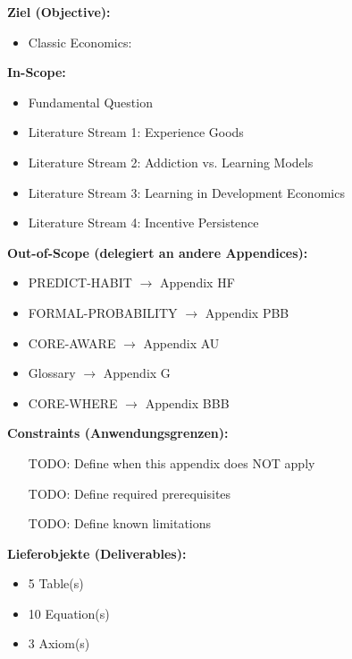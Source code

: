 \documentclass[11pt, a4paper]{article}
\begin{document}
\begin{tcolorbox}[
    colback=orange!5!white,
    colframe=orange!75!black,
    title={\textbf{Appendix Scope: Ziel / In-Scope / Out-of-Scope / Constraints}},
    fonttitle=\bfseries
]

\textbf{Ziel (Objective):}
\begin{itemize}[nosep]
    \item Classic Economics:
\end{itemize}

\textbf{In-Scope:}
\begin{itemize}[nosep]
    \item Fundamental Question
    \item Literature Stream 1: Experience Goods
    \item Literature Stream 2: Addiction vs. Learning Models
    \item Literature Stream 3: Learning in Development Economics
    \item Literature Stream 4: Incentive Persistence
\end{itemize}

\textbf{Out-of-Scope (delegiert an andere Appendices):}
\begin{itemize}[nosep]
    \item PREDICT-HABIT $\rightarrow$ Appendix HF
    \item FORMAL-PROBABILITY $\rightarrow$ Appendix PBB
    \item CORE-AWARE $\rightarrow$ Appendix AU
    \item Glossary $\rightarrow$ Appendix G
    \item CORE-WHERE $\rightarrow$ Appendix BBB
\end{itemize}

\textbf{Constraints (Anwendungsgrenzen):}
\begin{itemize}[nosep]
    \item [TODO: Define when this appendix does NOT apply]
    \item [TODO: Define required prerequisites]
    \item [TODO: Define known limitations]
\end{itemize}

\textbf{Lieferobjekte (Deliverables):}
\begin{itemize}[nosep]
    \item 5 Table(s)
    \item 10 Equation(s)
    \item 3 Axiom(s)
\end{itemize}

\end{tcolorbox}
\end{document}
